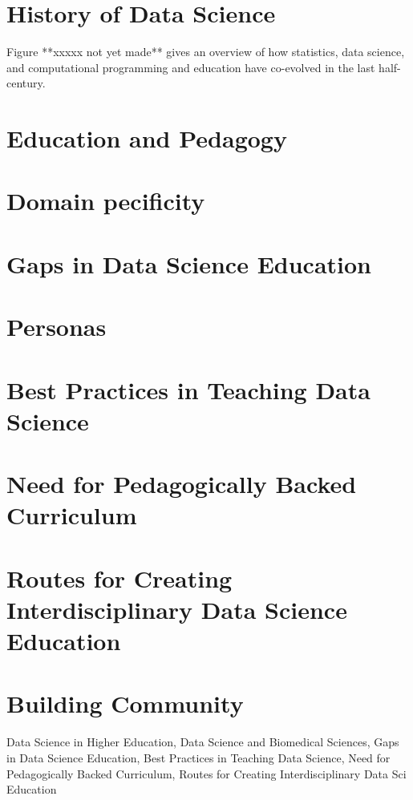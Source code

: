 \documentclass[../main.tex]{subfiles}
\begin{document}
    

    \section{History of Data Science}

        Figure **xxxxx not yet made** gives an overview of how
        statistics, data science, and computational programming and education
        have co-evolved in the last half-century.

        
        
        
        

    \section{Education and Pedagogy}

        
        

    \section{Domain pecificity}

    \section{Gaps in Data Science Education}

    \section{Personas}

    \section{Best Practices in Teaching Data Science}

    \section{Need for Pedagogically Backed Curriculum}

    \section{Routes for Creating Interdisciplinary Data Science Education}

    \section{Building Community}

    Data Science in Higher Education,
    Data Science and Biomedical Sciences,
    Gaps in Data Science Education,
    Best Practices in Teaching Data Science,
    Need for Pedagogically Backed Curriculum,
    Routes for Creating Interdisciplinary Data Sci Education
\end{document}
